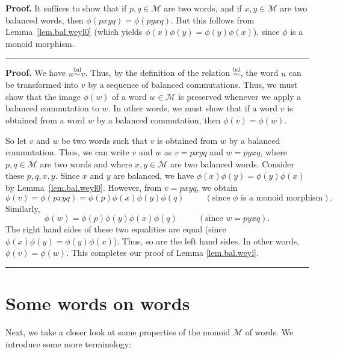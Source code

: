 \documentclass[numbers=enddot,12pt,final,onecolumn,notitlepage]{scrartcl}%
\theoremstyle{definition}
\newenvironment{proof}[1][Proof]{\noindent\textbf{#1.} }{\ \rule{0.5em}{0.5em}}
\newcommand{\M}{\mathcal{M}}
\newcommand{\balsim}{\overset{\operatorname*{bal}}{\sim}}
\newcommand{\tup}[1]{\left( #1 \right)}
\newenvironment{verlong}{}{}
\newenvironment{vershort}{}{}
\begin{document}
\begin{vershort}
\begin{proof}
It suffices to show that if $p, q \in \M$ are two words, and if $x, y \in \M$ are two balanced words, then $\phi\tup{pxyq} = \phi\tup{pyxq}$.
But this follows from Lemma~\ref{lem.bal.weyl0} (which yields $\phi\tup{x} \phi\tup{y} = \phi\tup{y} \phi\tup{x}$), since $\phi$ is a monoid morphism.
\end{proof}
\end{vershort}

\begin{verlong}
\begin{proof}
We have $u \balsim v$. Thus, by the definition of
the relation $\balsim$, the word $u$ can be
transformed into $v$ by a sequence of balanced commutations. Thus, we must
show that the image $\phi\left(  w\right)  $ of a word $w\in\M$ is
preserved whenever we apply a balanced commutation to $w$.
In other words, we must show that if a word $v$ is obtained from a word $w$ by a balanced commutation, then $\phi\tup{v} = \phi\tup{w}$.

So let $v$ and $w$ be two words such that $v$ is obtained from $w$ by a balanced commutation.
Thus, we can write $v$ and $w$ as $v = pxyq$ and $w = pyxq$, where $p, q \in \M$ are two words
and where $x, y \in \M$ are two balanced words.
Consider these $p, q, x, y$.
Since $x$ and $y$ are balanced, we have $\phi\tup{x} \phi\tup{y} = \phi\tup{y} \phi\tup{x}$ by Lemma~\ref{lem.bal.weyl0}.
However, from $v = pxyq$, we obtain
\[
\phi\tup{v} = \phi\tup{pxyq} = \phi\tup{p} \phi\tup{x} \phi\tup{y} \phi\tup{q} \ \ \ \ \ \ \ \ \ \ \ \left(\text{since $\phi$ is a monoid morphism}\right) .
\]
Similarly,
\[
\phi\tup{w} = \phi\tup{p} \phi\tup{y} \phi\tup{x} \phi\tup{q}
\ \ \ \ \ \ \ \ \ \ \ \left(\text{since $w = pyxq$}\right).
\]
The right hand sides of these two equalities are equal (since $\phi\tup{x} \phi\tup{y} = \phi\tup{y} \phi\tup{x}$).
Thus, so are the left hand sides.
In other words, $\phi\tup{v} = \phi\tup{w}$.
This completes our proof 
of Lemma \ref{lem.bal.weyl}.
\end{proof}
\end{verlong}

\section{Some words on words} \label{sec:words}

Next, we take a closer look at some properties of the monoid $\M$ of words.
We introduce some more terminology:
\end{document}
